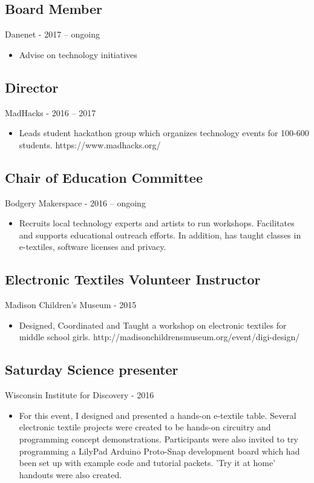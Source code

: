 \documentclass[../main.tex]{subfiles}
\begin{document}

\subsection*{Board Member}
     Danenet - 2017 -- ongoing
\begin{itemize}
		\item{Advise on technology initiatives}
\end{itemize}

\subsection*{Director}
     MadHacks - 2016 -- 2017
\begin{itemize}
		\item{Leads student hackathon group which organizes technology events for 100-600 students. https://www.madhacks.org/}
	\end{itemize}

\subsection*{Chair of Education Committee}
     Bodgery Makerspace - 2016 -- ongoing
\begin{itemize}
		\item{Recruits local technology experts and artists to run workshops. Facilitates and supports educational outreach efforts. In addition, has taught classes in e-textiles, software licenses and privacy.}
	\end{itemize}

\subsection*{Electronic Textiles Volunteer Instructor}
     Madison Children's Museum - 2015
\begin{itemize}
		\item{Designed, Coordinated and Taught a workshop on electronic textiles for middle school girls. http://madisonchildrensmuseum.org/event/digi-design/}
	\end{itemize}

\subsection*{Saturday Science presenter}
     Wisconsin Institute for Discovery - 2016
\begin{itemize}
		\item{For this event, I designed and presented a hands-on e-textile table. Several electronic textile projects were created to be hands-on circuitry and programming concept demonstrations. Participants were also invited to try programming a LilyPad Arduino Proto-Snap development board which had been set up with example code and tutorial packets. 'Try it at home' handouts were also created.}
	\end{itemize}
\end{document}
